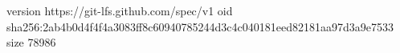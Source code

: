 version https://git-lfs.github.com/spec/v1
oid sha256:2ab4b0d4f4f4a3083ff8c60940785244d3c4c040181eed82181aa97d3a9e7533
size 78986
